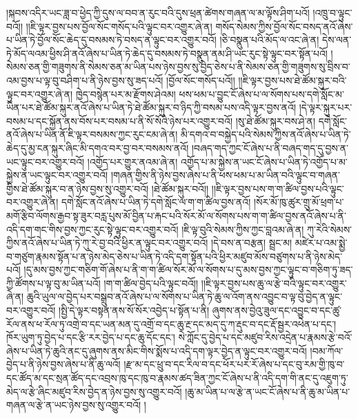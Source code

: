 །སྐབས་འདིར་ཡང་ཟླ་བ་ཕྱེད་ཀྱི་དུས་ལ་བབ་ན་རུང་བའི་དུས་ཕྲན་ཚེགས་གཞན་ལ་མ་ལྟོས་ཤིག་པའོ། །འཁྲུ་བ་ལྟུང་བའོ།། །།ཇི་ལྟར་བྱས་པས་བྱོལ་སོང་གསོད་པའི་ལྟུང་བར་འགྱུར་ཞེ་ན། གསོད་སེམས་ཀྱིས་བྱོལ་སོང་བསད་ནའོ་ཞེས་པ་ཡིན་ཏེ་བྱོལ་སོང་ཆེད་དུ་བསམས་ཏེ་བསད་ན་ལྟུང་བར་འགྱུར་བའོ། །ཅི་བསྣུན་པའི་མོད་ལ་འང་ཞེ་ན། དེས་ལན་ཏེ་མོད་ལའམ་ཕྱིས་ཤི་ནའོ་ཞེས་པ་ཡིན་ཏེ་ཆེད་དུ་བསམས་ཏེ་བསྣུན་ནམ་ཤི་ཡང་རུང་སྟེ་ལྟུང་བར་སྟོན་པའོ། །སེམས་ཅན་གྱི་གཟུགས་ནི་སེམས་ཅན་མ་ཡིན་པས་ཉེས་བྱས་སུ་བྱེད་ཅེས་པ་ནི་སེམས་ཅན་གྱི་གཟུགས་སུ་བྲིས་བ་འམ་བྱས་པ་ལྟ་བུ་བཤིག་པ་ནི་ཉེས་བྱས་སུ་ཟད་པའོ། །བྱོལ་སོང་གསོད་པའོ།། །།ཇི་ལྟར་བྱས་པས་ཐེ་ཚོམ་སྐུར་བའི་ལྟུང་བར་འགྱུར་ཞེ་ན། ཁྱེད་བསྙེན་པར་མ་རྫོགས་ཤེའམ། ཕས་ཕམ་པ་བྱུང་ངོ་ཞེས་པ་ལ་སོགས་པས་དགེ་སློང་མ་ཡིན་པར་ཐེ་ཚོམ་སྐུར་ནའོ་ཞེས་པ་ཡིན་ཏེ་ཐེ་ཚོམ་སྐུར་བ་ཉིད་ཀྱི་བསམ་པས་འདི་ལྟར་བྱས་ནའོ། །དེ་ལྟར་སྐུར་པར་བསམ་པ་དང་སྐྱོན་ནས་བོས་པར་བསམ་པ་ནི་སོ་སོའི་ཉེས་པར་འགྱུར་བའོ། །སུ་ཐེ་ཚོམ་སྐུར་བས་ཤེ་ན། དགེ་སློང་ནའོ་ཞེས་པ་ཡིན་ནོ་ཇི་ལྟར་བསམས་ཀྱང་རུང་ངམ་ཞེ་ན། མི་དགའ་བ་བསྐྱེད་པའི་སེམས་ཀྱིས་ནའོ་ཞེས་པ་ཡིན་ཏེ་ཆེད་དུ་མྱ་ངན་སྐུར་ཞིང་མི་དགའ་བར་བྱ་བར་བསམས་ནའོ། །བཞད་གད་ཀྱང་ངོ་ཞེས་པ་ནི་བཞད་གད་དུ་བྱས་ན་ཡང་ལྟུང་བར་འགྱུར་བའོ། །འགྱོད་པར་གྱུར་ནའམ་ཞེ་ན། འགྱོད་པ་མ་སྐྱེས་ན་ཡང་ངོ་ཞེས་པ་ཡིན་ཏེ་འགྱོད་པ་མ་སྐྱེས་ན་ཡང་ལྟུང་བར་འགྱུར་བའོ། །གཞན་གྱིས་ནི་ཉེས་བྱས་ཞེས་པ་ནི་ཕས་ཕམ་པ་མ་ཡིན་བའི་ལྟུང་བ་གཞན་གྱིས་ཐེ་ཚོམ་སྐུར་བ་ན་ཉེས་བྱས་སུ་འགྱུར་བའོ། །ཐེ་ཚོམ་སྐུར་བའོ།། །།ཇི་ལྟར་བྱས་པས་ག་ག་ཚིལ་བྱས་པའི་ལྟུང་བར་འགྱུར་ཞེ་ན། དགེ་སློང་ནའོ་ཞེས་པ་ཡིན་ཏེ་དགེ་སློང་ལ་ག་ག་ཚིལ་བྱས་ནའོ། །སོར་མོ་ཁུ་ཚུར་གྲུ་མོ་ཕྲག་པ་མགོ་རྩིབ་ལོགས་རྒྱབ་སྟ་ཟུར་བརླ་པུས་མོ་བྱིན་པ་རྐང་པའི་སོར་མོ་ལ་སོགས་པས་ག་ག་ཚིལ་བྱས་ནའོ་ཞེས་པ་ནི་འདི་དག་གང་གིས་བྱས་ཀྱང་རུང་སྟེ་ལྟུང་བར་འགྱུར་བའོ། །ཇི་ལྟ་བུའི་སེམས་ཀྱིས་ཀྱང་བླའམ་ཞེ་ན། ཀུ་རེའི་སེམས་ཀྱིས་ནའོ་ཞེས་པ་ཡིན་ཏེ་ཀུ་རེ་བྱ་བའི་ཕྱིར་ན་ལྟུང་བར་འགྱུར་བའོ། །དེ་བས་ན་བརྩན། སྦྲང་མ། མཛེར་པ་འམ་སྨྱེ་བ་གཙུག་རྣམས་སྟོན་པ་ན་ཉེས་མེད་ཅེས་པ་ཡིན་ཏེ་འདི་དག་སྟོན་པའི་ཕྱིར་མཛུབ་མོས་བཙུགས་པ་ནི་ཉེས་མེད་པའོ། །དུ་མས་བྱས་ཀྱང་གཅིག་གོ་ཞེས་པ་ནི་ག་ག་ཚིལ་སོར་མོ་ལ་སོགས་པ་དུ་མས་བྱས་ཀྱང་ལྟུང་བ་གཅིག་ཏུ་ཟད་ཀྱི་ཚོགས་པ་ལྟ་བུ་མ་ཡིན་པའོ། །ག་ག་ཚིལ་བྱེད་པའི་ལྟུང་བའོ།། །།ཇི་ལྟར་བྱས་པས་ཆུ་ལ་རྩེ་བའི་ལྟུང་བར་འགྱུར་ཞེ་ན། ཆུའི་ཡུལ་ལ་བྱེད་པར་བསྒྲུབ་ནའོ་ཞེས་པ་ལ་སོགས་པ་ཡིན་ཏེ་ཆུ་ལ་འོག་ནས་འབྱུང་བ་ལྟ་བུ་བྱེད་ན་ལྟུང་བར་འགྱུར་བའོ། །སྤྱི་དེ་ལྟར་བསྟན་ནས་སོ་སོར་འབྱེད་པ་སྟོན་པ་ནི། ཞུགས་ནས་བྱེའུ་ཟུལ་དང་འབྱུང་བ་དང་ཚུ་རོལ་ནས་ཕ་རོལ་ཏུ་འགྲེ་བ་དང་ཡན་མན་དུ་འགྲོ་བ་དང་ཆུ་རྔ་དང་མད་དུ་ཀ་རྡུང་བ་དང་རྡོ་སྦྱར་འཕེན་པ་དང་། ཁོར་ཡུག་ཏུ་བྱེད་པ་དང་རྩི་རར་བྱེད་པ་དང་ཆུ་དོང་དང་། སེ་ཀློང་དུ་བྱེད་པ་དང་མཛུབ་རིས་འདྲེན་པ་རྣམས་རྩེ་བའོ་ཞེས་པ་ཡིན་ཏེ་ཆུའི་ནང་དུ་ཞུགས་ནས་མིང་གིས་སྨོས་པ་འདི་དག་ལྟར་བྱེད་ན་ལྟུང་བར་འགྱུར་བའོ། །བམ་ཀོལ་བྱེད་པ་ནི་ཉེས་བྱས་ཞེས་པ་ནི་ཆུ་ལའོ། །རྫ་མ་དང་ཕྲུ་བ་དང་རིལ་བ་དང་ཕོར་པར་རོ་ཞེས་པ་དང་བུ་རམ་གྱི་ཁུ་བ་དང་ཚོད་མ་དང་སྲན་ཚོད་དང་འབྲས་ཁུ་དང་ཁུ་བ་རྣམས་ཚད་ཟིན་ཀྱང་ངོ་ཞེས་པ་ནི་འདི་དག་གི་ནང་དུ་འཇུག་ཏུ་མེད་ལ་རྩེ་ཞིང་མཛུབ་རིས་བྱེད་ན་ཉེས་བྱས་སུ་འགྱུར་བའོ། །ཆུ་མ་ཡིན་པ་ལ་རྩེ་ན་ཡང་ངོ་ཞེས་པ་ནི་ཆུ་མ་ཡིན་པ་གཞན་ལ་རྩེ་ན་ཡང་ཉེས་བྱས་སུ་འགྱུར་བའོ། །
